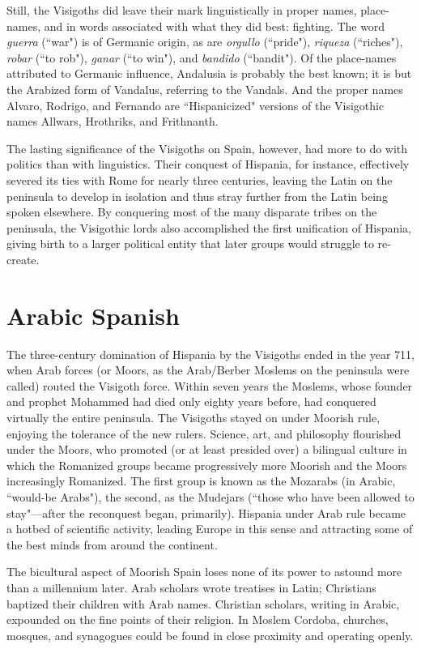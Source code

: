 Still, the Visigoths did leave their mark linguistically in proper
names, place-names, and in words associated with what they did best:
fighting. The word \emph{guerra} (``war") is of Germanic origin, as are \emph{orgullo}
(``pride"), \emph{riqueza} (``riches"), \emph{robar} (``to rob"), \emph{ganar} (``to win"), and
\emph{bandido} (``bandit"). Of the place-names attributed to Germanic influence, Andalusia is probably the best known; it is but the Arabized
form of Vandalus, referring to the Vandals. And the proper names Alvaro, Rodrigo, and Fernando are ``Hispanicized" versions of the Visigothic names Allwars, Hrothriks, and Frithnanth.

The lasting significance of the Visigoths on Spain, however,
had more to do with politics than with linguistics. Their conquest of
Hispania, for instance, effectively severed its ties with Rome for nearly
three centuries, leaving the Latin on the peninsula to develop in isolation and thus stray further from the Latin being spoken elsewhere. By
conquering most of the many disparate tribes on the peninsula, the
Visigothic lords also accomplished the first unification of Hispania,
giving birth to a larger political entity that later groups would struggle
to re-create.

\section{Arabic Spanish}

The three-century domination of Hispania by the Visigoths
ended in the year 711, when Arab forces (or Moors, as the Arab/Berber
Moslems on the peninsula were called) routed the Visigoth force.
Within seven years the Moslems, whose founder and prophet Mohammed had died only eighty years before, had conquered virtually the entire peninsula. The Visigoths stayed on under Moorish rule, enjoying
the tolerance of the new rulers. Science, art, and philosophy flourished
under the Moors, who promoted (or at least presided over) a bilingual
culture in which the Romanized groups became progressively more
Moorish and the Moors increasingly Romanized. The first group is
known as the Mozarabs (in Arabic, ``would-be Arabs"), the second, as
the Mudejars (``those who have been allowed to stay"---after the reconquest began, primarily). Hispania under Arab rule became a hotbed of
scientific activity, leading Europe in this sense and attracting some of
the best minds from around the continent.

The bicultural aspect of Moorish Spain loses none of its power
to astound more than a millennium later. Arab scholars wrote treatises
in Latin; Christians baptized their children with Arab names. Christian scholars, writing in Arabic, expounded on the fine points of their
religion. In Moslem Cordoba, churches, mosques, and synagogues
could be found in close proximity and operating openly.

